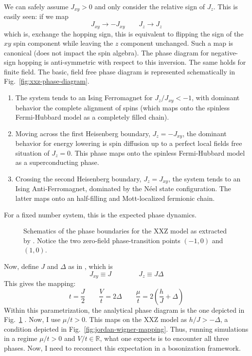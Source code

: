 We can safely assume $J_{xy}>0$ and only consider the relative sign of $J_z$. This is easily seen: if we map
\[
	J_{xy} \to - J_{xy}
	\qquad
	J_z \to J_z
\]
which is, exchange the hopping sign, this is equivalent to flipping the sign of the $xy$ spin component while leaving the $z$ component unchanged. Such a map is canonical (does not impact the spin algebra). The phase diagram for negative-sign hopping is anti-symmetric with respect to this inversion. The same holds for finite field. The basic, field free phase diagram is represented schematically in Fig.~\ref{fig:xxz-phase-diagram}.
\begin{enumerate}
	\item The system tends to an Ising Ferromagnet for $J_z / J_{xy} < -1$, with dominant behavior the complete alignment of spins (which maps onto the spinless Fermi-Hubbard model as a completely filled chain). 
	\item Moving across the first Heisenberg boundary, $J_z = - J_{xy}$, the dominant behavior for energy lowering is spin diffusion up to a perfect local fields free situation of $J_z = 0$. This phase maps onto the spinless Fermi-Hubbard model as a superconducting phase.
	\item Crossing the second Heisenberg boundary, $J_z = J_{xy}$, the system tends to an Ising Anti-Ferromagnet, dominated by the Néel state configuration. The latter maps onto an half-filling and Mott-localized fermionic chain.
\end{enumerate}
For a fixed number system, this is the expected phase dynamics.

\begin{figure}
	\centering
	
	\caption{Schematics of the phase boundaries for the $\mathrm{XXZ}$ model as extracted by \citeauthor{rakov2016symmetries} \cite{rakov2016symmetries}. Notice the two zero-field phase-transition points $(-1,0)$ and $(1,0)$.}
	\label{fig:xxz-field-phase-diagram}
\end{figure}

Now, define $J$ and $\Delta$ as in \cite{rakov2016symmetries}, which is
\[
	J_{xy} \equiv J
	\qquad\qquad
	J_z \equiv J\Delta
\]
This gives the mapping:
\begin{equation}\label{eq:xxz-fermions-parameters-map-2}
	t = \frac{J}{2}
	\qquad
	\frac{V}{t} = 2\Delta
	\qquad
	\frac{\mu}{t} = 2 \left(
		\frac{h}{J} + \Delta
	\right)
\end{equation}
Within this parametrization, the analytical phase diagram is the one depicted in Fig.~\ref{fig:xxz-field-phase-diagram} \cite{rakov2016symmetries}.
Now, I use $\mu/t > 0$. This maps on the $\mathrm{XXZ}$ model as $h/J > -\Delta$, a condition depicted in Fig.~\ref{fig:jordan-wigner-mapping}. Thus, running simulations in a regime $\mu/t > 0$ and $V/t \in \mathbb{R}$, what one expects is to encounter all three phases. Now, I need to reconnect this expectation in a bosonization framework.

